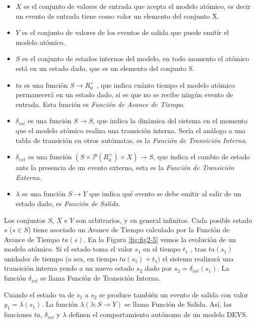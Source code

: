 	\begin{itemize}
	\item $X$ es el conjunto de valores de entrada que acepta el modelo atómico, es decir un evento de entrada tiene como valor un elemento del conjunto X.
	\item $Y$ es el conjunto de valores de los eventos de salida que puede emitir el modelo atómico.
	\item $S$ es el conjunto de estados internos del modelo, en todo momento el atómico está en un estado dado, que es un elemento del conjunto S.
	\item $ta$ es una función $S \to R^{+}_{0}$ , que indica cuánto tiempo el modelo atómico permanecerá en un estado dado, si es que no se recibe ningún 
	evento de entrada. Esta función es \emph{Función de Avance de Tiempo}.
	\item $\delta_{int}$ es una función $S \to S$, que indica la dinámica del sistema en el momento que el modelo atómico realiza una transición interna. 
	Sería el análogo a una tabla de transición en otros autómatas, es la \emph{Función de Transición Interna}.
	\item $\delta_{ext}$ es una función $(S \times \mathcal{P}(R^{+}_{0}) \times X) \to S$, que indica el cambio de estado ante la presencia de un evento 
	externo, esta es la \emph{Función de Transición Externa}.
	\item $\lambda$ es una función $S \to Y$ que indica qué evento se debe emitir al salir de un estado dado, es \emph{Función de Salida}.
	\end{itemize}

	Los conjuntos $S$, $X$ e $Y$ son arbitrarios, y en general infinitos. Cada posible estado $s$ ($s \in S$) tiene asociado un Avance de Tiempo calculado 
	por la Función de Avance de Tiempo $ta(s)$.
	En la Figura \ref{fig:fig2-5} vemos la evolución de un modelo atómico. Si el estado toma el valor $s_1$ en el tiempo $t_1$ , tras $ta(s_1)$ unidades de 
	tiempo (o sea, en tiempo $ta(s_1 ) + t_1 )$ el sistema realizará una transición interna yendo a un nuevo estado $s_2$ dado por $s_2 = \delta_{int} (s_1 )$. 
	La función $\delta_{int}$ se llama Función de Transición Interna.

	Cuando el estado va de $s_1$ a $s_2$ se produce también un evento de salida con valor $y_1 = \lambda(s_1)$. La función $\lambda (\lambda : S \to Y )$ se 
	llama Función de Salida. Así, las funciones $ta$, $\delta_{int}$ y $\lambda$ definen el comportamiento autónomo de un modelo DEVS.

